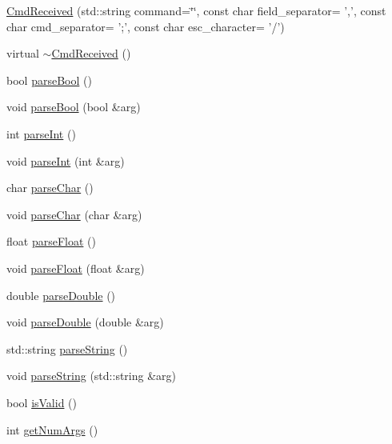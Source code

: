 \begin{DoxyCompactItemize}
\item 
\hyperlink{classcmd_1_1_cmd_received_a4e2d67c5a9de708c11c35a5ea2b5868a}{Cmd\+Received} (std\+::string command=\char`\"{}\char`\"{}, const char field\+\_\+separator= ',', const char cmd\+\_\+separator= ';', const char esc\+\_\+character= '/')
\item 
virtual \hyperlink{classcmd_1_1_cmd_received_aae3a60edebca81eccf26c132abd334bd}{$\sim$\+Cmd\+Received} ()
\item 
bool \hyperlink{classcmd_1_1_cmd_received_a09f6f7766f89968785c3525e3ce8a625}{parse\+Bool} ()
\item 
void \hyperlink{classcmd_1_1_cmd_received_a5f2ae1ffa5dd5312ec12c6e9a46ff24b}{parse\+Bool} (bool \&arg)
\item 
int \hyperlink{classcmd_1_1_cmd_received_a267e265e7bdf5f5e45c1153d78ca0223}{parse\+Int} ()
\item 
void \hyperlink{classcmd_1_1_cmd_received_a8bb8b048253bee5f092d9edd67f8b981}{parse\+Int} (int \&arg)
\item 
char \hyperlink{classcmd_1_1_cmd_received_a7f97a4443af5819d8bcd69e5c51cc4f0}{parse\+Char} ()
\item 
void \hyperlink{classcmd_1_1_cmd_received_a842709f94d709973b62bbd74320825a5}{parse\+Char} (char \&arg)
\item 
float \hyperlink{classcmd_1_1_cmd_received_ac29ede9c4b16e3a768b942a602c72f30}{parse\+Float} ()
\item 
void \hyperlink{classcmd_1_1_cmd_received_a6194b57482cf2f9e235821f03c364496}{parse\+Float} (float \&arg)
\item 
double \hyperlink{classcmd_1_1_cmd_received_a181d947566bb4a9e21725a4e99588c1f}{parse\+Double} ()
\item 
void \hyperlink{classcmd_1_1_cmd_received_a8866107ea61e761416948066b428e54f}{parse\+Double} (double \&arg)
\item 
std\+::string \hyperlink{classcmd_1_1_cmd_received_adf3bc587f2a9b3007b4a5e447116a871}{parse\+String} ()
\item 
void \hyperlink{classcmd_1_1_cmd_received_ad0a14bef5f41acdbe3dba8369fdc015a}{parse\+String} (std\+::string \&arg)
\item 
bool \hyperlink{classcmd_1_1_cmd_received_aff6110aee1a7f6f4f4c0d1542e6cec44}{is\+Valid} ()
\item 
int \hyperlink{classcmd_1_1_cmd_received_af5b660106fb59805494bbb733d1ca5ff}{get\+Num\+Args} ()
\end{DoxyCompactItemize}


